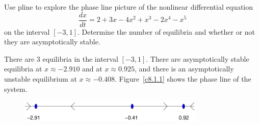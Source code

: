 \documentclass{ximera}
\begin{document}
\begin{computerExercise} \label{c8.1.1}
Use {\sf pline} to explore the phase line 
picture of the nonlinear differential equation
\[
\frac{dx}{dt} = 2 + 3x - 4x^2 + x^3 - 2x^4 -x^5
\]
on the interval $[-3,1]$.  Determine the number of equilibria
and whether or not they are asymptotically stable.

\begin{solution}

There are 3 equilibria in the interval $[-3,1]$.  There are
asymptotically stable equilibria at $x\approx -2.910$ and at 
$x\approx 0.925$, and there is an asymptotically unstable equilibrium at
$x \approx -0.408$.  Figure~\ref{c8.1.1} shows the phase line
of the system.

\begin{figure}[htb]
                       \centerline{%
                       \includegraphics[width=3.5in]{exfigure/8-1-1.pdf}}
\end{figure}

\end{solution}
\end{computerExercise}
\end{document}
